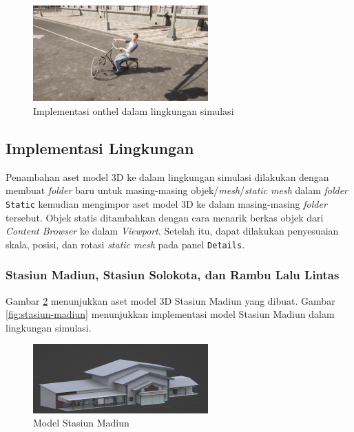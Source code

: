 \begin{figure}[!h]
    \centering
    \includegraphics[width=0.6\textwidth]{resources/chapter-4/onthel-carla.png}
    \caption{Implementasi onthel dalam lingkungan simulasi}
    \label{fig:onthel-carla}
\end{figure}

\subsection{Implementasi Lingkungan}

Penambahan aset model 3D ke dalam lingkungan simulasi dilakukan dengan membuat
\textit{folder} baru untuk masing-masing objek/\textit{mesh}/\textit{static
mesh} dalam \textit{folder} \verb|Static| kemudian mengimpor aset model 3D ke
dalam masing-masing \textit{folder} tersebut. Objek statis ditambahkan dengan
cara menarik berkas objek dari \textit{Content Browser} ke dalam
\textit{Viewport}. Setelah itu, dapat dilakukan penyesuaian skala, posisi, dan
rotasi \textit{static mesh} pada panel \verb|Details|.

\subsubsection{Stasiun Madiun, Stasiun Solokota, dan Rambu Lalu Lintas}

Gambar \ref{fig:stasiun-madiun-model} menunjukkan aset model 3D Stasiun Madiun
yang dibuat. Gambar \ref{fig:stasiun-madiun} menunjukkan implementasi model
Stasiun Madiun dalam lingkungan simulasi.

\begin{figure}[!h]
    \centering
    \includegraphics[width=0.6\textwidth]{resources/chapter-3-stasiun-madiun-model.png}
    \caption{Model Stasiun Madiun}
    \label{fig:stasiun-madiun-model}
\end{figure}

